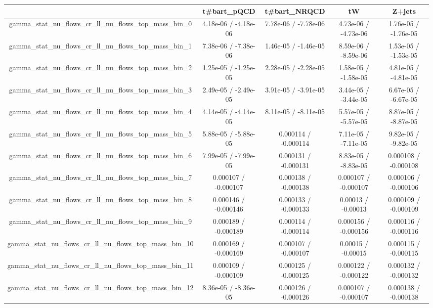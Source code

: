 \documentclass[10pt]{article}
\begin{document}
\begin{table}[htbp]
\begin{center}
\begin{tabular}{|c|c|c|c|c|}
\hline 
      & t#bar{t}_{pQCD}      & t#bar{t}_{NRQCD}      & tW      & Z+jets \\ 
\hline 
  gamma_stat_nu_flows_cr_ll_nu_flows_top_mass_bin_0 & 4.18e-06 / -4.18e-06 & 7.78e-06 / -7.78e-06 & 4.73e-06 / -4.73e-06 & 1.76e-05 / -1.76e-05 \\ 
  gamma_stat_nu_flows_cr_ll_nu_flows_top_mass_bin_1 & 7.38e-06 / -7.38e-06 & 1.46e-05 / -1.46e-05 & 8.59e-06 / -8.59e-06 & 1.53e-05 / -1.53e-05 \\ 
  gamma_stat_nu_flows_cr_ll_nu_flows_top_mass_bin_2 & 1.25e-05 / -1.25e-05 & 2.28e-05 / -2.28e-05 & 1.58e-05 / -1.58e-05 & 4.81e-05 / -4.81e-05 \\ 
  gamma_stat_nu_flows_cr_ll_nu_flows_top_mass_bin_3 & 2.49e-05 / -2.49e-05 & 3.91e-05 / -3.91e-05 & 3.44e-05 / -3.44e-05 & 6.67e-05 / -6.67e-05 \\ 
  gamma_stat_nu_flows_cr_ll_nu_flows_top_mass_bin_4 & 4.14e-05 / -4.14e-05 & 8.11e-05 / -8.11e-05 & 5.57e-05 / -5.57e-05 & 8.87e-05 / -8.87e-05 \\ 
  gamma_stat_nu_flows_cr_ll_nu_flows_top_mass_bin_5 & 5.88e-05 / -5.88e-05 & 0.000114 / -0.000114 & 7.11e-05 / -7.11e-05 & 9.82e-05 / -9.82e-05 \\ 
  gamma_stat_nu_flows_cr_ll_nu_flows_top_mass_bin_6 & 7.99e-05 / -7.99e-05 & 0.000131 / -0.000131 & 8.83e-05 / -8.83e-05 & 0.000108 / -0.000108 \\ 
  gamma_stat_nu_flows_cr_ll_nu_flows_top_mass_bin_7 & 0.000107 / -0.000107 & 0.000138 / -0.000138 & 0.000107 / -0.000107 & 0.000106 / -0.000106 \\ 
  gamma_stat_nu_flows_cr_ll_nu_flows_top_mass_bin_8 & 0.000146 / -0.000146 & 0.000133 / -0.000133 & 0.00013 / -0.00013 & 0.000109 / -0.000109 \\ 
  gamma_stat_nu_flows_cr_ll_nu_flows_top_mass_bin_9 & 0.000189 / -0.000189 & 0.000114 / -0.000114 & 0.000156 / -0.000156 & 0.000116 / -0.000116 \\ 
  gamma_stat_nu_flows_cr_ll_nu_flows_top_mass_bin_10 & 0.000169 / -0.000169 & 0.000107 / -0.000107 & 0.00015 / -0.00015 & 0.000115 / -0.000115 \\ 
  gamma_stat_nu_flows_cr_ll_nu_flows_top_mass_bin_11 & 0.000109 / -0.000109 & 0.000125 / -0.000125 & 0.000122 / -0.000122 & 0.000132 / -0.000132 \\ 
  gamma_stat_nu_flows_cr_ll_nu_flows_top_mass_bin_12 & 8.36e-05 / -8.36e-05 & 0.000126 / -0.000126 & 0.000107 / -0.000107 & 0.000138 / -0.000138 \\ 

\end{tabular}
\end{center}
\end{table}
\end{document}
